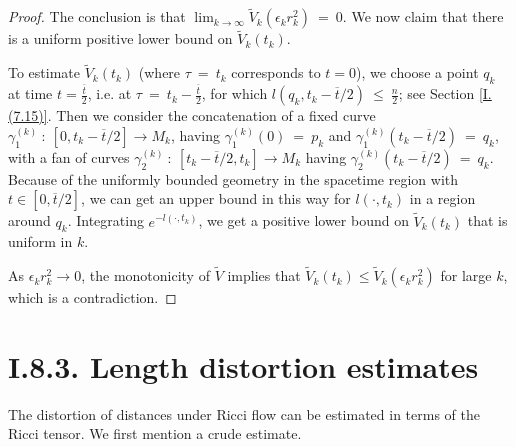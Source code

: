 \begin{proof}
The conclusion is that $\lim_{k \rightarrow \infty}
\tilde{V}_k(\epsilon_k r_k^2) \: = \: 0$. We now claim that there is a
uniform positive lower bound on $\tilde{V}_k(t_k)$.

To estimate $\tilde{V}_k(t_k)$ (where $\tau \: = \: t_k$ corresponds to
$t = 0$), we choose a point $q_k$ at time $t = \frac{\overline{t}}{2}$, i.e. at
$\tau \: = \: t_k - \frac{\overline{t}}{2}$, for which
$l(q_k, t_k - \overline{t}/2)
\: \le \: \frac{n}{2}$; see Section \ref{I.(7.15)}. Then we consider the concatenation of a
fixed curve $\gamma^{(k)}_1 \: : \:
[0,   t_k - \overline{t}/2] \rightarrow M_k$, having
$\gamma^{(k)}_1(0) \: = \: p_k$ and
$\gamma^{(k)}_1(t_k - \overline{t}/2) \: = \: q_k$,
with a fan of curves
$\gamma^{(k)}_2 \: : \: [t_k - \overline{t}/2, t_k] \rightarrow M_k$
having $\gamma^{(k)}_2(t_k - \overline{t}/2) \: = \: q_k$.
Because of the uniformly bounded geometry
in the spacetime region with $t \in [0, \overline{t}/2]$,
we can get an upper bound in
this way
for $l(\cdot, t_k)$ in a region around $q_k$. Integrating
$e^{-l(\cdot, t_k)}$, we get a positive lower bound on $\tilde{V}_k(t_k)$
that is uniform in $k$.

As
$\epsilon_k r_k^2 \rightarrow 0$, the monotonicity of $\tilde{V}$
implies that $\tilde{V}_k(t_k) \le \tilde{V}_k(\epsilon_k r_k^2)$
for large $k$, which is a contradiction.
\end{proof}

\section{I.8.3. Length distortion estimates}
\label{secI.8.3}

The distortion of distances under Ricci flow can be estimated in terms
of the Ricci tensor.
We first mention a crude estimate.

